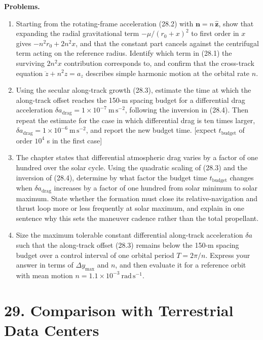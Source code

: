 \documentclass[
  11pt,
  openany,
  oneside]{book}
\begin{document}
\textbf{Problems.}

\begin{enumerate}
\def\labelenumi{\arabic{enumi}.}
\item
  Starting from the rotating-frame acceleration (28.2) with
  \(\mathbf{n} = n\,\hat{\mathbf{z}}\), show that expanding the radial
  gravitational term \(-\mu/(r_0+x)^2\) to first order in \(x\) gives
  \(-n^2 r_0 + 2 n^2 x\), and that the constant part cancels against the
  centrifugal term acting on the reference radius. Identify which term
  in (28.1) the surviving \(2 n^2 x\) contribution corresponds to, and
  confirm that the cross-track equation \(\ddot z + n^2 z = a_z\)
  describes simple harmonic motion at the orbital rate \(n\).
\item
  Using the secular along-track growth (28.3), estimate the time at
  which the along-track offset reaches the 150-m spacing budget for a
  differential drag acceleration
  \(\delta a_{\mathrm{drag}} = 1\times 10^{-7}\ \mathrm{m\,s^{-2}}\),
  following the inversion in (28.4). Then repeat the estimate for the
  case in which differential drag is ten times larger,
  \(\delta a_{\mathrm{drag}} = 1\times 10^{-6}\ \mathrm{m\,s^{-2}}\),
  and report the new budget time. {[}expect \(t_{\mathrm{budget}}\) of
  order \(10^4\) s in the first case{]}
\item
  The chapter states that differential atmospheric drag varies by a
  factor of one hundred over the solar cycle. Using the quadratic
  scaling of (28.3) and the inversion of (28.4), determine by what
  factor the budget time \(t_{\mathrm{budget}}\) changes when
  \(\delta a_{\mathrm{drag}}\) increases by a factor of one hundred from
  solar minimum to solar maximum. State whether the formation must close
  its relative-navigation and thrust loop more or less frequently at
  solar maximum, and explain in one sentence why this sets the maneuver
  cadence rather than the total propellant.
\item
  Size the maximum tolerable constant differential along-track
  acceleration \(\delta a\) such that the along-track offset (28.3)
  remains below the 150-m spacing budget over a control interval of one
  orbital period \(T = 2\pi/n\). Express your answer in terms of
  \(\Delta y_{\max}\) and \(n\), and then evaluate it for a reference
  orbit with mean motion
  \(n = 1.1\times 10^{-3}\ \mathrm{rad\,s^{-1}}\).
\end{enumerate}

\chapter{29. Comparison with Terrestrial Data
Centers}\label{comparison-with-terrestrial-data-centers}
\end{document}
